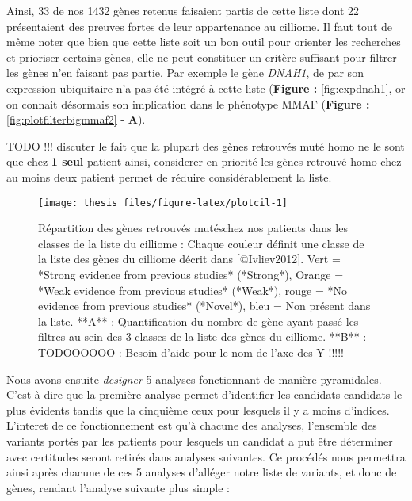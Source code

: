 \documentclass[12pt,twoside]{reedthesis}
\theoremstyle{definition}
\theoremstyle{definition}
\theoremstyle{remark}
\begin{document}
  Ainsi, 33 de nos 1432 gènes retenus faisaient partis de cette liste dont
  22 présentaient des preuves fortes de leur appartenance au cilliome. Il
  faut tout de même noter que bien que cette liste soit un bon outil pour
  orienter les recherches et prioriser certains gènes, elle ne peut
  constituer un critère suffisant pour filtrer les gènes n'en faisant pas
  partie. Par exemple le gène \emph{DNAH1}, de par son expression
  ubiquitaire n'a pas été intégré à cette liste (\textbf{Figure :
  }\ref{fig:expdnah1}, or on connait désormais son implication dans le
  phénotype MMAF (\textbf{Figure : }\ref{fig:plotfilterbigmmaf2} -
  \textbf{A}).
  
  TODO !!! discuter le fait que la plupart des gènes retrouvés muté homo
  ne le sont que chez \textbf{1 seul} patient ainsi, considerer en
  priorité les gènes retrouvé homo chez au moins deux patient permet de
  réduire considérablement la liste.
  
  \newpage 
  
  \begin{figure}
  
  {\centering \texttt{[image: thesis\_files/figure-latex/plotcil-1]} 
  
  }
  
  \caption[Répartition des gènes retrouvés mutéschez nos patients dans les classes de la liste du cilliome]{Répartition des gènes retrouvés mutéschez nos patients dans les classes de la liste du cilliome : Chaque couleur définit une classe de la liste des gènes du cilliome décrit dans [@Ivliev2012]. Vert = *Strong evidence from previous studies* (*Strong*), Orange = *Weak evidence from previous studies* (*Weak*), rouge = *No evidence from previous studies* (*Novel*), bleu = Non présent dans la liste. **A** : Quantification du nombre de gène ayant passé les filtres au sein des 3 classes de la liste des gènes du cilliome. **B** : TODOOOOOO : Besoin d'aide pour le nom de l'axe des Y !!!!!}\label{fig:plotcil}
  \end{figure}
  
  \newpage  
  
  Nous avons ensuite \emph{designer} 5 analyses fonctionnant de manière
  pyramidales. C'est à dire que la première analyse permet d'identifier
  les candidats candidats le plus évidents tandis que la cinquième ceux
  pour lesquels il y a moins d'indices. L'interet de ce fonctionnement est
  qu'à chacune des analyses, l'ensemble des variants portés par les
  patients pour lesquels un candidat a put être déterminer avec certitudes
  seront retirés dans analyses suivantes. Ce procédés nous permettra ainsi
  après chacune de ces 5 analyses d'alléger notre liste de variants, et
  donc de gènes, rendant l'analyse suivante plus simple :
  
\end{document}
